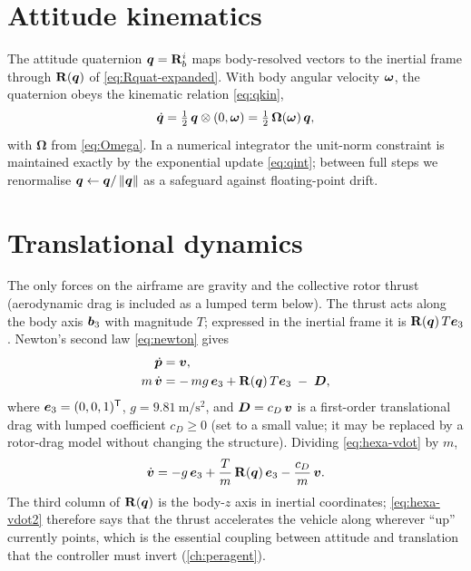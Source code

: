 \section{Attitude kinematics}

The attitude quaternion $\bm{q}=\mathbf{R}_b^i$ maps body-resolved vectors to the
inertial frame through $\mathbf{R}(\bm{q})$ of \cref{eq:Rquat-expanded}. With body
angular velocity $\bm{\omega}$, the quaternion obeys the kinematic relation
\cref{eq:qkin},
\begin{equation}
\dot{\bm{q}}=\tfrac12\,\bm{q}\otimes(0,\bm{\omega})
=\tfrac12\,\bm{\Omega}(\bm{\omega})\,\bm{q},
\label{eq:hexa-qkin}
\end{equation}
with $\bm{\Omega}$ from \cref{eq:Omega}. In a numerical integrator the unit-norm
constraint is maintained exactly by the exponential update \cref{eq:qint};
between full steps we renormalise $\bm{q}\leftarrow\bm{q}/\left\lVert \bm{q} \right\rVert$ as
a safeguard against floating-point drift.

\section{Translational dynamics}

The only forces on the airframe are gravity and the collective rotor thrust
(aerodynamic drag is included as a lumped term below). The thrust acts along the
body axis $\bm{b}_3$ with magnitude $T$; expressed in the inertial frame it is
$\mathbf{R}(\bm{q})\,T\bm{e}_3$. Newton's second law \cref{eq:newton} gives
\begin{align}
\dot{\bm{p}} &= \bm{v}, \label{eq:hexa-pdot}\\
m\,\dot{\bm{v}} &= -\,m g\,\bm{e}_3 + \mathbf{R}(\bm{q})\,T\bm{e}_3
\;-\; \bm{D}, \label{eq:hexa-vdot}
\end{align}
where $\bm{e}_3=(0,0,1)^{\mathsf{T}}$, $g=\SI{9.81}{\meter\per\second\squared}$, and
$\bm{D}=c_D\,\bm{v}$ is a first-order translational drag with lumped coefficient
$c_D\ge0$ (set to a small value; it may be replaced by a rotor-drag model
without changing the structure). Dividing \cref{eq:hexa-vdot} by $m$,
\begin{equation}
\dot{\bm{v}} = -g\,\bm{e}_3 + \frac{T}{m}\,\mathbf{R}(\bm{q})\,\bm{e}_3
- \frac{c_D}{m}\,\bm{v}.
\label{eq:hexa-vdot2}
\end{equation}
The third column of $\mathbf{R}(\bm{q})$ is the body-$z$ axis in inertial
coordinates; \cref{eq:hexa-vdot2} therefore says that the thrust accelerates the
vehicle along wherever ``up'' currently points, which is the essential coupling
between attitude and translation that the controller must invert
(\cref{ch:peragent}).

